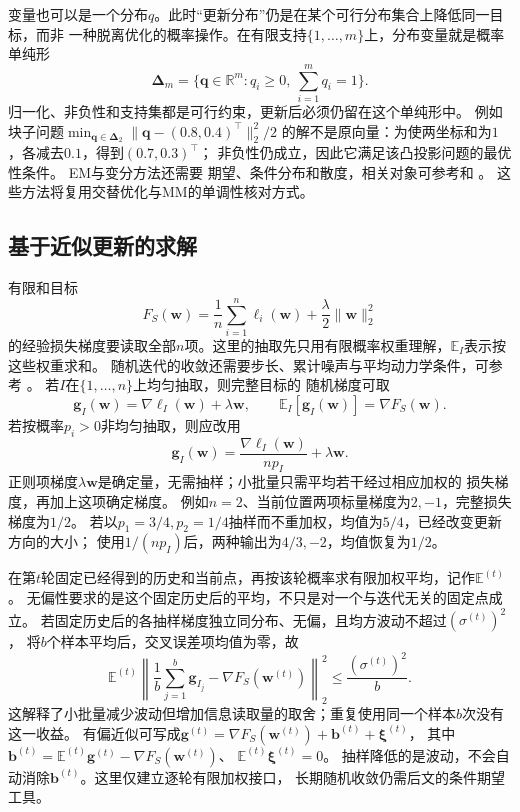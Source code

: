 变量也可以是一个分布$q$。此时“更新分布”仍是在某个可行分布集合上降低同一目标，而非
一种脱离优化的概率操作。在有限支持$\{1,\ldots,m\}$上，分布变量就是概率单纯形
\[
  \bm{\Delta}_m
  =\{\bm{q}\in\mathbb{R}^m:q_i\geq0,\ \sum_{i=1}^m q_i=1\}.
\]
归一化、非负性和支持集都是可行约束，更新后必须仍留在这个单纯形中。
例如块子问题$\min_{\bm q\in\bm\Delta_2}\|\bm q-(0.8,0.4)^\top\|_2^2/2$
的解不是原向量：为使两坐标和为$1$，各减去$0.1$，得到$(0.7,0.3)^\top$；
非负性仍成立，因此它满足该凸投影问题的最优性条件。
EM与变分方法还需要
期望、条件分布和散度，相关对象可参考和
。
这些方法将复用交替优化与MM的单调性核对方式。

\subsection{基于近似更新的求解}
\label{sec:opt-stochastic-gradient-stability}

有限和目标
\[
  F_S(\bm{w})=\frac1n\sum_{i=1}^n\ell_i(\bm{w})
  +\frac{\lambda}{2}\lVert\bm{w}\rVert_2^2
\]
的经验损失梯度要读取全部$n$项。这里的抽取先只用有限概率权重理解，$\mathbb E_I$表示按这些权重求和。
随机迭代的收敛还需要步长、累计噪声与平均动力学条件，可参考
。
若$I$在$\{1,\ldots,n\}$上均匀抽取，则完整目标的
随机梯度可取
\[
  \bm{g}_I(\bm{w})
  =\nabla\ell_I(\bm{w})+\lambda\bm{w},\qquad
  \mathbb{E}_I[\bm{g}_I(\bm{w})]
  =\nabla F_S(\bm{w}).
\]
若按概率$p_i>0$非均匀抽取，则应改用
\[
  \bm{g}_I(\bm{w})
  =\frac{\nabla\ell_I(\bm{w})}{np_I}+\lambda\bm{w}.
\]
正则项梯度$\lambda\bm{w}$是确定量，无需抽样；小批量只需平均若干经过相应加权的
损失梯度，再加上这项确定梯度。
例如$n=2$、当前位置两项标量梯度为$2,-1$，完整损失梯度为$1/2$。
若以$p_1=3/4,p_2=1/4$抽样而不重加权，均值为$5/4$，已经改变更新方向的大小；
使用$1/(np_I)$后，两种输出为$4/3,-2$，均值恢复为$1/2$。

在第$t$轮固定已经得到的历史和当前点，再按该轮概率求有限加权平均，记作$\mathbb E^{(t)}$。
无偏性要求的是这个固定历史后的平均，不只是对一个与迭代无关的固定点成立。
若固定历史后的各抽样梯度独立同分布、无偏，且均方波动不超过$(\sigma^{(t)})^2$，
将$b$个样本平均后，交叉误差项均值为零，故
\[
 \mathbb E^{(t)}\left\|\frac1b\sum_{j=1}^b\bm g_{I_j}
             -\nabla F_S(\bm w^{(t)})\right\|_2^2
 \leq\frac{(\sigma^{(t)})^2}{b}.
\]
这解释了小批量减少波动但增加信息读取量的取舍；重复使用同一个样本$b$次没有这一收益。
有偏近似可写成$\bm g^{(t)}=\nabla F_S(\bm w^{(t)})+\bm b^{(t)}+\bm\xi^{(t)}$，
其中$\bm b^{(t)}=\mathbb E^{(t)}\bm g^{(t)}-\nabla F_S(\bm w^{(t)})$、
$\mathbb E^{(t)}\bm\xi^{(t)}=0$。
抽样降低的是波动，不会自动消除$\bm b^{(t)}$。这里仅建立逐轮有限加权接口，
长期随机收敛仍需后文的条件期望工具。

